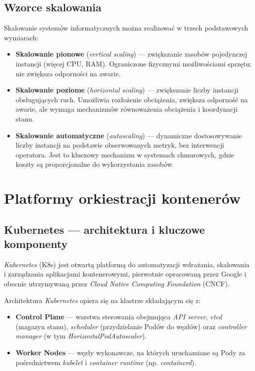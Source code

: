 \subsection{Wzorce skalowania}

Skalowanie systemów informatycznych można realizować w trzech podstawowych wymiarach:

\begin{itemize}
  \item \textbf{Skalowanie pionowe} (\textit{vertical scaling}) — zwiększanie zasobów pojedynczej instancji (więcej CPU, RAM). Ograniczone fizycznymi możliwościami sprzętu; nie zwiększa odporności na awarie.
  \item \textbf{Skalowanie poziome} (\textit{horizontal scaling}) — zwiększanie liczby instancji obsługujących ruch. Umożliwia rozłożenie obciążenia, zwiększa odporność na awarie, ale wymaga mechanizmów równoważenia obciążenia i koordynacji stanu.
  \item \textbf{Skalowanie automatyczne} (\textit{autoscaling}) — dynamiczne dostosowywanie liczby instancji na podstawie obserwowanych metryk, bez interwencji operatora. Jest to kluczowy mechanizm w systemach chmurowych, gdzie koszty są proporcjonalne do wykorzystania zasobów.
\end{itemize}

\section{Platformy orkiestracji kontenerów}

\subsection{Kubernetes — architektura i kluczowe komponenty}

\textit{Kubernetes} (K8s) jest otwartą platformą do automatyzacji wdrażania, skalowania i zarządzania aplikacjami kontenerowymi, pierwotnie opracowaną przez Google i obecnie utrzymywaną przez \textit{Cloud Native Computing Foundation} (CNCF).

Architektura \textit{Kubernetes} opiera się na klastrze składającym się z:

\begin{itemize}
  \item \textbf{Control Plane} — warstwa sterowania obejmująca \textit{API server}, \textit{etcd} (magazyn stanu), \textit{scheduler} (przydzielanie Podów do węzłów) oraz \textit{controller manager} (w tym \textit{HorizontalPodAutoscaler}).
  \item \textbf{Worker Nodes} — węzły wykonawcze, na których uruchamiane są Pody za pośrednictwem \textit{kubelet} i \textit{container runtime} (np. \textit{containerd}).
\end{itemize}

